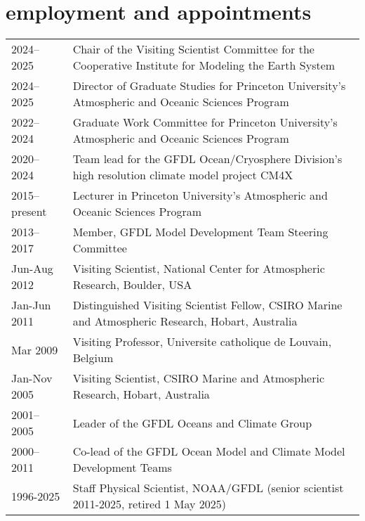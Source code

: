 \documentclass{article}
\begin{document}
\vspace{-.5cm}
\section*{\sc \color{Maroon} employment and appointments} 
\vspace{-.25cm}
\begin{tabular}{ll}
  2024--2025 & Chair of the Visiting Scientist  Committee for the Cooperative Institute for Modeling the Earth System 
  \\
  
   2024--2025 & Director of Graduate Studies for Princeton University's Atmospheric and Oceanic Sciences Program
  \\
  
  2022--2024 & Graduate Work Committee for Princeton University's Atmospheric and Oceanic Sciences Program
  \\
  
  2020--2024 & Team lead for the GFDL Ocean/Cryosphere Division's high resolution climate model project CM4X 
  \\

  2015--present & Lecturer in Princeton University's Atmospheric and Oceanic Sciences Program
  \\
 
  2013--2017  & Member, GFDL Model Development Team Steering Committee  \\
  
  Jun-Aug 2012  & Visiting Scientist, National Center for Atmospheric
                  Research, Boulder, USA \\

  Jan-Jun 2011   & Distinguished Visiting Scientist Fellow, CSIRO Marine and Atmospheric Research, Hobart, Australia \\
 
  Mar 2009         & Visiting Professor, Universite catholique de Louvain, Belgium \\
 
  Jan-Nov 2005   & Visiting Scientist, CSIRO Marine and Atmospheric  Research, Hobart, Australia \\
 
  2001--2005     & Leader of the GFDL Oceans and Climate Group \\
 
  2000--2011     & Co-lead of the GFDL Ocean Model and Climate Model Development Teams \\
  
  1996-2025   &  Staff Physical Scientist, NOAA/GFDL (senior scientist 2011-2025, retired 1 May 2025)  \\  
  

\end{tabular}
\end{document}
